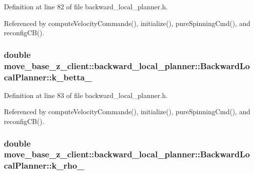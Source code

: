 Definition at line 82 of file backward\+\_\+local\+\_\+planner.\+h.



Referenced by compute\+Velocity\+Commands(), initialize(), pure\+Spinning\+Cmd(), and reconfig\+C\+B().

\subsubsection[{\texorpdfstring{k\+\_\+betta\+\_\+}{k_betta_}}]{\setlength{\rightskip}{0pt plus 5cm}double move\+\_\+base\+\_\+z\+\_\+client\+::backward\+\_\+local\+\_\+planner\+::\+Backward\+Local\+Planner\+::k\+\_\+betta\+\_\+\hspace{0.3cm}{\ttfamily [private]}}\hypertarget{classmove__base__z__client_1_1backward__local__planner_1_1BackwardLocalPlanner_aa2f7fe022cdc4eb11c17f6f576c732c6}{}\label{classmove__base__z__client_1_1backward__local__planner_1_1BackwardLocalPlanner_aa2f7fe022cdc4eb11c17f6f576c732c6}


Definition at line 83 of file backward\+\_\+local\+\_\+planner.\+h.



Referenced by compute\+Velocity\+Commands(), initialize(), pure\+Spinning\+Cmd(), and reconfig\+C\+B().

\subsubsection[{\texorpdfstring{k\+\_\+rho\+\_\+}{k_rho_}}]{\setlength{\rightskip}{0pt plus 5cm}double move\+\_\+base\+\_\+z\+\_\+client\+::backward\+\_\+local\+\_\+planner\+::\+Backward\+Local\+Planner\+::k\+\_\+rho\+\_\+\hspace{0.3cm}{\ttfamily [private]}}\hypertarget{classmove__base__z__client_1_1backward__local__planner_1_1BackwardLocalPlanner_a9ae9a8c4c4663a999ba107aea9f6868d}{}\label{classmove__base__z__client_1_1backward__local__planner_1_1BackwardLocalPlanner_a9ae9a8c4c4663a999ba107aea9f6868d}


